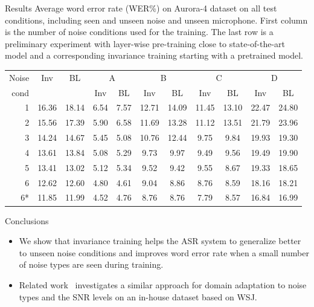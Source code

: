 \documentclass[final]{beamer}
\newlength{\onecolwid}
\begin{document}
\begin{frame}[t]
\begin{columns}[t]
\begin{column}{\onecolwid}
\begin{block}{Results}
    Average word error rate (WER\%) on Aurora-4 dataset on all test conditions,
        including seen and unseen noise and unseen microphone. First column
        is the number of noise conditions used for the training. The last row is a 
        preliminary experiment with layer-wise pre-training close to state-of-the-art
        model and a corresponding invariance training starting with a pretrained model.
\begin{table}
    \centering
    \label{tab:results}
    \begin{tabular}{r|cc||cc|cc|cc|cc}
        Noise       &Inv&BL&  \multicolumn{2}{c|}{A} & \multicolumn{2}{c|}{B} & \multicolumn{2}{c|}{C} & \multicolumn{2}{c}{D}\\
        cond  & & &  Inv & BL & Inv & BL & Inv & BL & Inv & BL\\
    \hline
    1           &16.36        &18.14 &6.54&7.57    &12.71& 14.09   & 11.45&   13.10    & 22.47 &   24.80    \\
    2           &15.56        &17.39 &5.90&  6.58 &   11.69   &13.28   &11.12   &13.51   &21.79   &23.96 \\
    3           &14.24        &14.67 &5.45 & 5.08&    10.76&   12.44&   9.75&    9.84 &   19.93&   19.30\\
    4           &13.61        &13.84 & 5.08 &5.29    &9.73    &9.97    &9.49    &9.56    &19.49   &19.90\\         
    5           &13.41        &13.02 & 5.12 &5.34    &9.52    &9.42    &9.55    &8.67    &19.33   &18.65\\         
    6           &12.62        &12.60 & 4.80 &4.61    &9.04    &8.86    &8.76    &8.59    &18.16   &18.21\\
    \hline\hline
    6*          &11.85        &11.99 &4.52    &4.76    &8.76    &8.76    &7.79    &8.57    &16.84&    16.99
    \end{tabular}
\end{table}
\end{block}

\begin{block}{Conclusions}
    \begin{itemize}
        \item We show that invariance training helps the ASR system to generalize better to unseen noise 
            conditions and improves word error rate when a small number of noise types are seen during 
            training. 

        \item Related work~\cite{yusuke2016adversarial} investigates a similar approach for domain 
            adaptation to noise types and the SNR levels on an in-house dataset based on WSJ.
        

\end{itemize}
\end{block}
\end{column}
\end{columns}
\end{frame}
\end{document}
